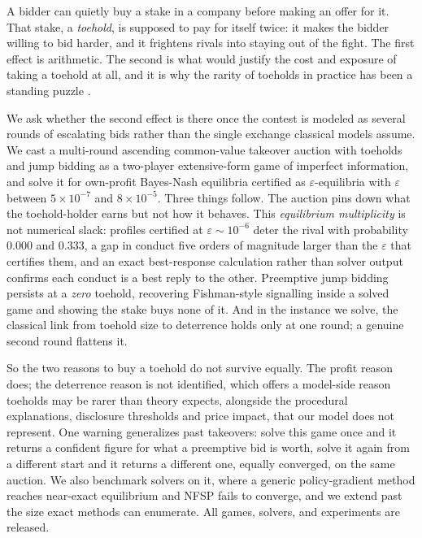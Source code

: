 \documentclass[11pt,a4paper]{article}
\begin{document}
\begin{tcolorbox}[
  colback=sparqcorallight,
  colframe=sparqcoralborder,
  arc=3pt,
  boxrule=1pt,
  left=9pt, right=9pt, top=7pt, bottom=7pt,
  title={\textbf{Abstract}},
  fonttitle=\normalsize,
  coltitle=white,
  colbacktitle=sparqcoral,
  attach boxed title to top left={yshift=-2mm, xshift=5mm},
  boxed title style={arc=2pt, boxrule=0pt}
]
A bidder can quietly buy a stake in a company before making an offer for it. That stake, a \emph{toehold}, is supposed to pay for itself twice: it makes the bidder willing to bid harder, and it frightens rivals into staying out of the fight. The first effect is arithmetic. The second is what would justify the cost and exposure of taking a toehold at all, and it is why the rarity of toeholds in practice has been a standing puzzle \citep{bettoneckbothorburn2009}.

We ask whether the second effect is there once the contest is modeled as several rounds of escalating bids rather than the single exchange classical models assume. We cast a multi-round ascending common-value takeover auction with toeholds and jump bidding as a two-player extensive-form game of imperfect information, and solve it for own-profit Bayes-Nash equilibria certified as $\varepsilon$-equilibria with $\varepsilon$ between $5\times10^{-7}$ and $8\times10^{-5}$. Three things follow. The auction pins down what the toehold-holder earns but not how it behaves. This \emph{equilibrium multiplicity} is not numerical slack: profiles certified at $\varepsilon\sim10^{-6}$ deter the rival with probability $0.000$ and $0.333$, a gap in conduct five orders of magnitude larger than the $\varepsilon$ that certifies them, and an exact best-response calculation rather than solver output confirms each conduct is a best reply to the other. Preemptive jump bidding persists at a \emph{zero} toehold, recovering Fishman-style signalling inside a solved game and showing the stake buys none of it. And in the instance we solve, the classical link from toehold size to deterrence holds only at one round; a genuine second round flattens it.

So the two reasons to buy a toehold do not survive equally. The profit reason does; the deterrence reason is not identified, which offers a model-side reason toeholds may be rarer than theory expects, alongside the procedural explanations, disclosure thresholds and price impact, that our model does not represent. One warning generalizes past takeovers: solve this game once and it returns a confident figure for what a preemptive bid is worth, solve it again from a different start and it returns a different one, equally converged, on the same auction. We also benchmark solvers on it, where a generic policy-gradient method reaches near-exact equilibrium and NFSP fails to converge, and we extend past the size exact methods can enumerate. All games, solvers, and experiments are released.


\end{tcolorbox}
\end{document}

